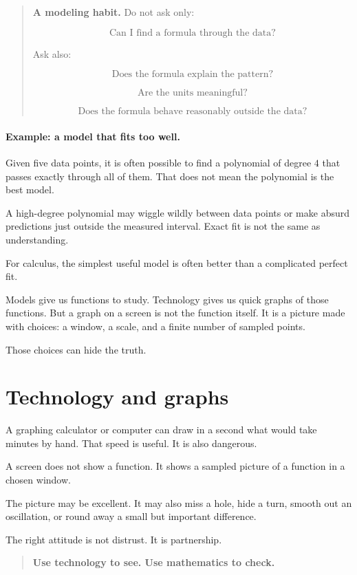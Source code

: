 \begin{quote}
\textbf{A modeling habit.}
Do not ask only:

\[
\text{Can I find a formula through the data?}
\]

Ask also:

\[
\text{Does the formula explain the pattern?}
\]

\[
\text{Are the units meaningful?}
\]

\[
\text{Does the formula behave reasonably outside the data?}
\]
\end{quote}

\paragraph{Example: a model that fits too well.}
Given five data points, it is often possible to find a polynomial of degree \(4\) that passes exactly through all of them. That does not mean the polynomial is the best model.

A high-degree polynomial may wiggle wildly between data points or make absurd predictions just outside the measured interval. Exact fit is not the same as understanding.

For calculus, the simplest useful model is often better than a complicated perfect fit.

Models give us functions to study. Technology gives us quick graphs of those functions. But a graph on a screen is not the function itself. It is a picture made with choices: a window, a scale, and a finite number of sampled points.

Those choices can hide the truth.

\section{Technology and graphs}
\label{sec:technology-and-graphs}

A graphing calculator or computer can draw in a second what would take minutes by hand. That speed is useful. It is also dangerous.

A screen does not show a function. It shows a sampled picture of a function in a chosen window.

The picture may be excellent. It may also miss a hole, hide a turn, smooth out an oscillation, or round away a small but important difference.

The right attitude is not distrust. It is partnership.

\begin{quote}
\textbf{Use technology to see. Use mathematics to check.}
\end{quote}

